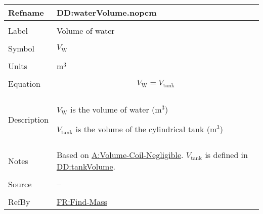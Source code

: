 \documentclass[12pt]{article}
\begin{document}

\vspace{\baselineskip}
\noindent
\begin{minipage}{\textwidth}
\begin{tabular}{>{\raggedright}p{}>{\raggedright\arraybackslash}p{}}
\toprule \textbf{Refname} & \textbf{DD:waterVolume.nopcm}
\label{DD:waterVolume.nopcm}
\\ \midrule \\
Label & Volume of water
        
\\ \midrule \\
Symbol & ${V_{\text{W}}}$
         
\\ \midrule \\
Units & ${\text{m}^{3}}$
        
\\ \midrule \\
Equation & \begin{displaymath}
           {V_{\text{W}}}={V_{\text{tank}}}
           \end{displaymath}
\\ \midrule \\
Description & \begin{symbDescription}
              \item{${V_{\text{W}}}$ is the volume of water (${\text{m}^{3}}$)}
              \item{${V_{\text{tank}}}$ is the volume of the cylindrical tank (${\text{m}^{3}}$)}
              \end{symbDescription}
\\ \midrule \\
Notes & Based on \hyperref[assumpVCN]{A:Volume-Coil-Negligible}. ${V_{\text{tank}}}$ is defined in \hyperref[DD:tankVolume]{DD:tankVolume}.
        
\\ \midrule \\
Source & --
         
\\ \midrule \\
RefBy & \hyperref[findMass]{FR:Find-Mass}
        
\\ \bottomrule
\end{tabular}
\end{minipage}

\end{document}
